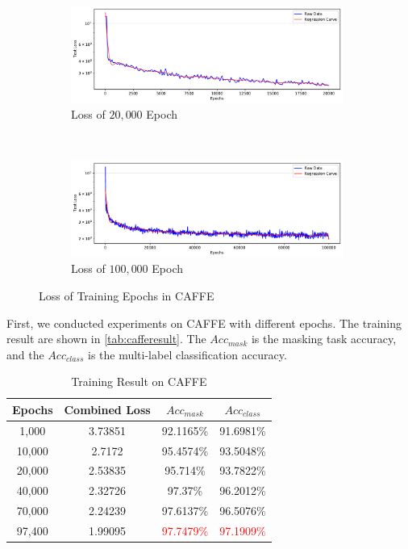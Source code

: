 \begin{spacing}{1.5}
\begin{figure}[ht]
    \centering
    \begin{subfigure}[b]{0.99\textwidth}
        \centering
        \includegraphics[width=0.98\textwidth, fbox]{Chapter5/testloss20000.pdf}
        \caption{Loss of $20,000$ Epoch}
    \end{subfigure}
    \\
    \begin{subfigure}[b]{0.99\textwidth}
        \centering
        \includegraphics[width=0.98\textwidth, fbox]{Chapter5/testloss100000.pdf}
        \caption{Loss of $100,000$ Epoch}
    \end{subfigure}
    \caption{Loss of Training Epochs in CAFFE}
    \label{fig:testloss}
\end{figure}


First, we conducted experiments on CAFFE with different epochs. The training result are shown in \autoref{tab:cafferesult}. The $Acc_{mask}$ is the masking task accuracy, and the $Acc_{class}$ is the multi-label classification accuracy.

\begin{table}[ht]
\centering
\caption{Training Result on CAFFE}
\label{tab:cafferesult}
\begin{tabular}{@{}cccc@{}}
\toprule
\textbf{Epochs} & \textbf{Combined Loss} & \textbf{$Acc_{mask}$} & \textbf{$Acc_{class}$} \\ \midrule
1,000 & 3.73851 & 92.1165\% & 91.6981\% \\
10,000 & 2.7172 & 95.4574\% & 93.5048\% \\
20,000 & 2.53835 & 95.714\% & 93.7822\% \\
40,000 & 2.32726 & 97.37\% & 96.2012\% \\
70,000 & 2.24239 & 97.6137\% & 96.5076\% \\
97,400 & 1.99095 & \textcolor{red}{97.7479\%} & \textcolor{red}{97.1909\%} \\ \bottomrule
\end{tabular}
\end{table}


\end{spacing}
